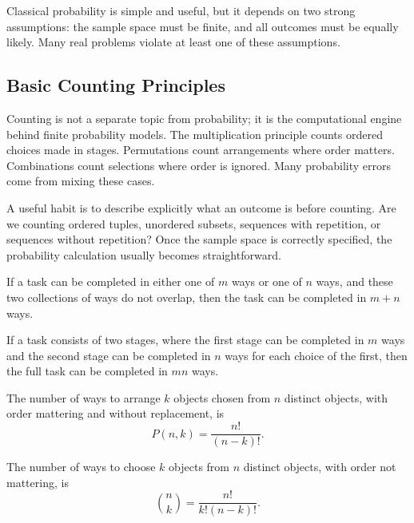 Classical probability is simple and useful, but it depends on two strong assumptions: the sample space must be finite, and all outcomes must be equally likely. Many real problems violate at least one of these assumptions.

\subsection{Basic Counting Principles}


Counting is not a separate topic from probability; it is the computational engine behind finite probability models. The multiplication principle counts ordered choices made in stages. Permutations count arrangements where order matters. Combinations count selections where order is ignored. Many probability errors come from mixing these cases.

A useful habit is to describe explicitly what an outcome is before counting. Are we counting ordered tuples, unordered subsets, sequences with repetition, or sequences without repetition? Once the sample space is correctly specified, the probability calculation usually becomes straightforward.

\begin{proposition}
If a task can be completed in either one of $m$ ways or one of $n$ ways, and these two collections of ways do not overlap, then the task can be completed in $m+n$ ways.
\end{proposition}

\begin{proposition}
If a task consists of two stages, where the first stage can be completed in $m$ ways and the second stage can be completed in $n$ ways for each choice of the first, then the full task can be completed in $mn$ ways.
\end{proposition}

\begin{definition}[Permutation]
The number of ways to arrange $k$ objects chosen from $n$ distinct objects, with order mattering and without replacement, is
\[
    P(n,k)=\frac{n!}{(n-k)!}.
\]
\end{definition}

\begin{definition}[Combination]
The number of ways to choose $k$ objects from $n$ distinct objects, with order not mattering, is
\[
    \binom{n}{k}=\frac{n!}{k!(n-k)!}.
\]
\end{definition}


